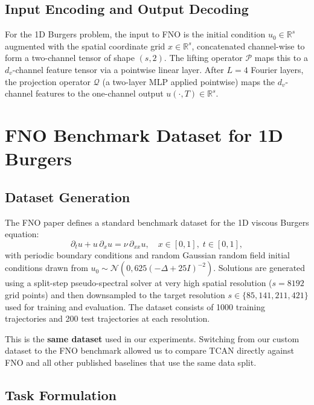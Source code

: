 \subsection{Input Encoding and Output Decoding}

For the 1D Burgers problem, the input to FNO is the initial condition $u_0 \in \mathbb{R}^s$ augmented with the spatial coordinate grid $x \in \mathbb{R}^s$, concatenated channel-wise to form a two-channel tensor of shape $(s, 2)$. The lifting operator $\mathcal{P}$ maps this to a $d_v$-channel feature tensor via a pointwise linear layer. After $L = 4$ Fourier layers, the projection operator $\mathcal{Q}$ (a two-layer MLP applied pointwise) maps the $d_v$-channel features to the one-channel output $u(\cdot, T) \in \mathbb{R}^s$.

\section{FNO Benchmark Dataset for 1D Burgers}
\label{sec:fno:dataset}

\subsection{Dataset Generation}

The FNO paper defines a standard benchmark dataset for the 1D viscous Burgers equation:
\begin{equation}
  \partial_t u + u\,\partial_x u = \nu\,\partial_{xx} u, \quad x \in [0,1],\; t \in [0,1],
\end{equation}
with periodic boundary conditions and random Gaussian random field initial conditions drawn from $u_0 \sim \mathcal{N}(0, 625(-\Delta + 25I)^{-2})$. Solutions are generated using a split-step pseudo-spectral solver at very high spatial resolution ($s = 8192$ grid points) and then downsampled to the target resolution $s \in \{85, 141, 211, 421\}$ used for training and evaluation. The dataset consists of 1000 training trajectories and 200 test trajectories at each resolution.

This is the \textbf{same dataset} used in our experiments. Switching from our custom dataset to the FNO benchmark allowed us to compare TCAN directly against FNO and all other published baselines that use the same data split.

\subsection{Task Formulation}

